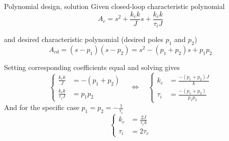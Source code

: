 \documentclass[dvisvgm,hypertex,aspectratio=169]{beamer}
\begin{document}
\begin{frame}[label=C5S]{Polynomial design, solution}
  Given closed-loop characteristic polynomial
  \[ A_{c} =  s^2 + \frac{k_c k}{J}s + \frac{k_c k}{\tau_i J}\]

  and desired characteristic polynomial (desired poles $p_1$ and $p_2$)
  \[ A_{cd}=(s-p_1)(s-p_2) = s^2 - (p_1+p_2)s + p_1p_2 \]

  Setting corresponding coefficients equal and solving gives
  \[ \begin{cases} \frac{k_c k}{J} &= -(p_1+p_2)\\ \frac{k_c k}{\tau_i J} &= p_1p_2\end{cases}
    \quad \Leftrightarrow\quad
    \begin{cases} k_c  &= \frac{-(p_1+p_2)J}{k}\\ \tau_i &= \frac{-(p_1+p_2)}{p_1p_2} \end{cases} \]
  And for the specific case $p_1 = p_2 = -\frac{1}{\tau_c}$
  \[    \begin{cases} k_c &= \frac{2J}{\tau_ck}\\ \tau_i &= 2\tau_c \end{cases} \]
\end{frame}

\note{%
}
\end{document}
